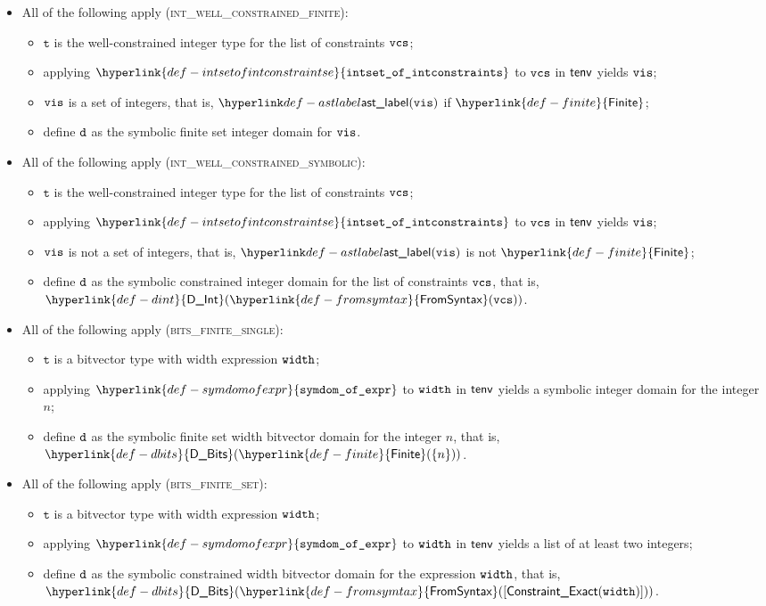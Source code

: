 \documentclass{book}
\newcommand\DInt[0]{\hyperlink{def-dint}{\textsf{D\_Int}}}
\newcommand\DBits[0]{\hyperlink{def-dbits}{\textsf{D\_Bits}}}
\newcommand\Finite[0]{\hyperlink{def-finite}{\textsf{Finite}}}
\newcommand\FromSyntax[0]{\hyperlink{def-fromsymtax}{\textsf{FromSyntax}}}
\newcommand\symdomofexpr[0]{\hyperlink{def-symdomofexpr}{\texttt{symdom\_of\_expr}}}
\newcommand\intsetofintconstraints[0]{\hyperlink{def-intsetofintconstraintse}{\texttt{intset\_of\_intconstraints}}}
\newcommand\vt[0]{\texttt{t}}
\begin{document}
\begin{itemize}
  \item All of the following apply (\textsc{int\_well\_constrained\_finite}):
  \begin{itemize}
    \item $\vt$ is the well-constrained integer type for the list of constraints $\texttt{vcs}$;
    \item applying $\intsetofintconstraints$ to $\texttt{vcs}$ in $\textsf{tenv}$ yields $\texttt{vis}$;
    \item $\texttt{vis}$ is a set of integers, that is, $\astlabel(\vis)$ if $\Finite$;
    \item define $\texttt{d}$ as the symbolic finite set integer domain for $\texttt{vis}$.
  \end{itemize}

  \item All of the following apply (\textsc{int\_well\_constrained\_symbolic}):
  \begin{itemize}
    \item $\vt$ is the well-constrained integer type for the list of constraints $\texttt{vcs}$;
    \item applying $\intsetofintconstraints$ to $\texttt{vcs}$ in $\textsf{tenv}$ yields $\texttt{vis}$;
    \item $\texttt{vis}$ is not a set of integers, that is, $\astlabel(\vis)$ is not $\Finite$;
    \item define $\texttt{d}$ as the symbolic constrained integer domain for the list of constraints $\texttt{vcs}$, that is, $\DInt(\FromSyntax(\vcs))$.
  \end{itemize}

  \item All of the following apply (\textsc{bits\_finite\_single}):
  \begin{itemize}
    \item $\vt$ is a bitvector type with width expression $\texttt{width}$;
    \item applying $\symdomofexpr$ to $\texttt{width}$ in $\textsf{tenv}$ yields a symbolic integer domain for the integer $n$;
    \item define $\texttt{d}$ as the symbolic finite set width bitvector domain for the integer $n$, that is, \\
          $\DBits(\Finite(\{n\}))$.
  \end{itemize}

  \item All of the following apply (\textsc{bits\_finite\_set}):
  \begin{itemize}
    \item $\vt$ is a bitvector type with width expression $\texttt{width}$;
    \item applying $\symdomofexpr$ to $\texttt{width}$ in $\textsf{tenv}$ yields a list of at least two integers;
    \item define $\texttt{d}$ as the symbolic constrained width bitvector domain for the expression $\texttt{width}$, that is, $\DBits(\FromSyntax([\ConstraintExact(\width)]))$.
  \end{itemize}


\end{itemize}
\end{document}
